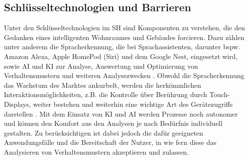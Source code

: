     \subsection*{Schlüsseltechnologien und Barrieren}
        Unter den Schlüsseltechnologien im \acl{SH} sind Komponenten zu verstehen, die den Gedanken eines intelligenten 
        Wohnraumes und Gebäudes forcieren. Dazu zählen unter anderem die Spracherkennung, die bei Sprachassistenten, 
        darunter bspw. Amazon Alexa, Apple HomePod (Siri) und dem Google Nest, eingesetzt wird, sowie \ac{AI} und \ac{KI} 
        zur Analyse, Auswertung und Optimierung von Verhaltensmustern und weiteren Analysezwecken \cite{statista2021}. 
        Obwohl die Spracherkennung das Wachstum des Marktes ankurbelt, werden die herkömmlichen Interaktionsmöglichkeiten, 
        z.B. die Kontrolle über Berührung durch Touch-Displays,
        weiter bestehen und weiterhin eine wichtige Art des Gerätezugriffs darstellen \cite{all-electronics2022}. 
        Mit dem Einsatz von \acs{KI} und \acs{AI} werden Prozesse noch autonomer und können den Komfort aus den Analysen je 
        nach Bedürfnis individuell gestalten. Zu berücksichtigen ist dabei jedoch die dafür geeigneten Anwendungsfälle und 
        die Bereitschaft der Nutzer, in wie fern diese das Analysieren von Verhaltensmustern akzeptieren und zulassen. 
            
